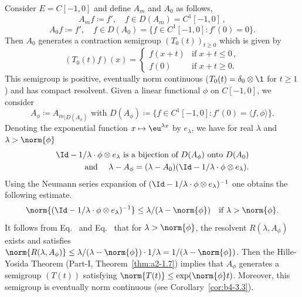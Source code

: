 \begin{example}
\begin{enumerate}[\upshape (i), wide, labelindent=.25em]
	Consider $E = C[-1,0]$ and define $A_{m}$ and $A_{0}$ as follows,
	\begin{equation}\label{eq:b3-2.23}
		A_{m}f \coloneqq f', \quad f \in D(A_{m}) = C^{1}[-1,0]\,,
	\end{equation}
	\begin{equation}\label{eq:b3-2.24}
		A_{0}f \coloneqq f', \quad f \in D(A_{0}) = \{f \in C^{1}[-1,0] \colon f'(0) = 0\}.
	\end{equation}
	Then $A_{0}$ generates a contraction semigroup $(T_{0}(t))_{t \geq 0}$ which is given by
	\begin{equation}\label{eq:b3-2.25}
		(T_{0}(t)f)(x) = \begin{cases}
			f(x+t) & \text{if } x+t \leq 0\,, \\
			f(0) & \text{if } x+t \geq 0.
		\end{cases}
	\end{equation}
	This semigroup is positive, eventually norm continuous ($T_{0}(t) = \delta_{0}\otimes \1$ for $t \geq 1$) and has compact resolvent.
	Given a linear functional $\phi$ on $C[-1,0]$, we consider
	\begin{equation}\label{eq:b3-2.26}
		A_{\phi} \coloneqq {A_{m}}_{|D(A_{\phi})} \text{ with } D(A_{\phi}) \coloneqq \{f \in C^{1}[-1,0] \colon f'(0) = \langle f,\phi \rangle\}.
	\end{equation}
	Denoting the exponential function $x \mapsto \eu^{\lambda x}$ by $e_{\lambda}$, we have for real $\lambda$ and $\lambda > \norm{\phi}$
	 \begin{equation}\label{eq:b3-2.27}
	 \begin{aligned}
		\Id  - 1/\lambda \cdot \phi \otimes e_{\lambda} \text{ is a bijection of } D(A_{\phi}) \text{ onto } D(A_{0})   \\
		\text{ and }\quad \lambda - A_{\phi} = (\lambda - A_{0})(\Id  - 1/\lambda \cdot \phi \otimes e_{\lambda}).
	\end{aligned}
	\end{equation}
	Using the Neumann series expansion of\/ $(\Id  - 1/\lambda \cdot \phi \otimes e_{\lambda})^{-1}$ one obtains the following estimate.
	\begin{equation}\label{eq:b3-2.28}
		\norm{(\Id  - 1/\lambda \cdot \phi \otimes e_{\lambda})^{-1}} \leq \lambda/(\lambda - \norm{\phi}) \quad \text{if } \lambda > \norm{\phi}.
	\end{equation}
It follows from Eq.~ and Eq.~ that for $\lambda > \norm{\phi}$, the resolvent $R(\lambda,A_{\phi})$ exists and satisfies $\norm{R(\lambda,A_{\phi})} \leq \lambda/(\lambda-\norm{\phi})\cdot 1/\lambda = 1/(\lambda-\norm{\phi})$.
Then the Hille-Yosida Theorem (Part-I, Theorem~\ref{thm:a2-1.7}) implies that $A_{\phi}$ generates a semigroup $(T(t))$ satisfying $\norm{T(t)} \leq \exp(\norm{\phi}t)$.
Moreover, this semigroup is eventually norm continuous (see Corollary~\ref{cor:b4-3.3}).


\end{enumerate}
\end{example}
